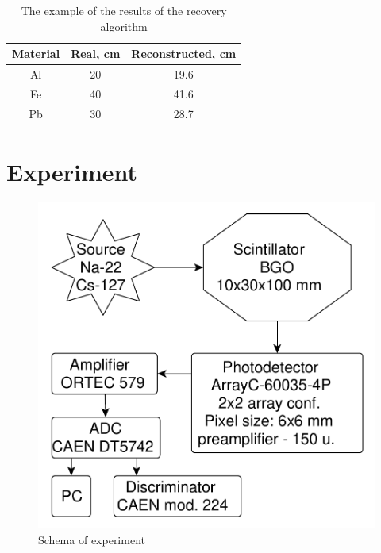 \documentclass[a4paper]{panl}
\begin{document}
\begin{table}
    \caption{The example of the results of the recovery algorithm}
    \label{tab:rec}
\begin{center}
        \begin{tabular}[c]{|c|c|c|}
        \hline 
        Material & Real, cm & Reconstructed, cm \\ 
        \hline 
        Al & 20 & 19.6 \\ 
        \hline 
        Fe & 40 & 41.6 \\ 
        \hline 
        Pb & 30 & 28.7 \\ 
        \hline 
    \end{tabular}
\end{center}
\end{table}

\newpage
\section*{Experiment}
\begin{figure} 
    \includegraphics[width=\linewidth]{figures/yed.pdf}  
    \vspace{-3mm}
    \caption{Schema of experiment}
    \vspace{-5mm}
\end{figure}
\end{document}
